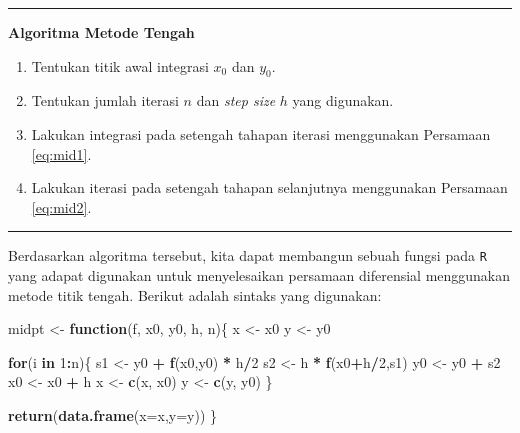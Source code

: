 \documentclass[]{book}
\newenvironment{Shaded}{\begin{snugshade}}{\end{snugshade}}
\newcommand{\ControlFlowTok}[1]{\textcolor[rgb]{0.13,0.29,0.53}{\textbf{#1}}}
\newcommand{\DataTypeTok}[1]{\textcolor[rgb]{0.13,0.29,0.53}{#1}}
\newcommand{\DecValTok}[1]{\textcolor[rgb]{0.00,0.00,0.81}{#1}}
\newcommand{\KeywordTok}[1]{\textcolor[rgb]{0.13,0.29,0.53}{\textbf{#1}}}
\newcommand{\NormalTok}[1]{#1}
\newcommand{\OperatorTok}[1]{\textcolor[rgb]{0.81,0.36,0.00}{\textbf{#1}}}
\newcommand{\StringTok}[1]{\textcolor[rgb]{0.31,0.60,0.02}{#1}}
\providecommand{\tightlist}{%
  \setlength{\itemsep}{0pt}\setlength{\parskip}{0pt}}
\theoremstyle{definition}
\theoremstyle{definition}
\theoremstyle{definition}
\theoremstyle{remark}
\begin{document}
\begin{center}\rule{0.5\linewidth}{\linethickness}\end{center}

\textbf{Algoritma Metode Tengah}

\begin{enumerate}
\def\labelenumi{\arabic{enumi}.}
\tightlist
\item
  Tentukan titik awal integrasi \(x_0\) dan \(y_0\).
\item
  Tentukan jumlah iterasi \(n\) dan \emph{step size} \(h\) yang digunakan.
\item
  Lakukan integrasi pada setengah tahapan iterasi menggunakan Persamaan \eqref{eq:mid1}.
\item
  Lakukan iterasi pada setengah tahapan selanjutnya menggunakan Persamaan \eqref{eq:mid2}.
\end{enumerate}

\begin{center}\rule{0.5\linewidth}{\linethickness}\end{center}

Berdasarkan algoritma tersebut, kita dapat membangun sebuah fungsi pada \texttt{R} yang adapat digunakan untuk menyelesaikan persamaan diferensial menggunakan metode titik tengah. Berikut adalah sintaks yang digunakan:

\begin{Shaded}
\begin{Highlighting}[]
\NormalTok{midpt <-}\StringTok{ }\ControlFlowTok{function}\NormalTok{(f, x0, y0, h, n)\{}
\NormalTok{  x <-}\StringTok{ }\NormalTok{x0}
\NormalTok{  y <-}\StringTok{ }\NormalTok{y0}
  
  \ControlFlowTok{for}\NormalTok{(i }\ControlFlowTok{in} \DecValTok{1}\OperatorTok{:}\NormalTok{n)\{}
\NormalTok{    s1 <-}\StringTok{ }\NormalTok{y0 }\OperatorTok{+}\StringTok{ }\KeywordTok{f}\NormalTok{(x0,y0) }\OperatorTok{*}\StringTok{ }\NormalTok{h}\OperatorTok{/}\DecValTok{2}
\NormalTok{    s2 <-}\StringTok{ }\NormalTok{h }\OperatorTok{*}\StringTok{ }\KeywordTok{f}\NormalTok{(x0}\OperatorTok{+}\NormalTok{h}\OperatorTok{/}\DecValTok{2}\NormalTok{,s1)}
\NormalTok{    y0 <-}\StringTok{ }\NormalTok{y0 }\OperatorTok{+}\StringTok{ }\NormalTok{s2}
\NormalTok{    x0 <-}\StringTok{ }\NormalTok{x0 }\OperatorTok{+}\StringTok{ }\NormalTok{h}
\NormalTok{    x <-}\StringTok{ }\KeywordTok{c}\NormalTok{(x, x0)}
\NormalTok{    y <-}\StringTok{ }\KeywordTok{c}\NormalTok{(y, y0)}
\NormalTok{  \}}
  
  \KeywordTok{return}\NormalTok{(}\KeywordTok{data.frame}\NormalTok{(}\DataTypeTok{x=}\NormalTok{x,}\DataTypeTok{y=}\NormalTok{y))}
\NormalTok{\}}
\end{Highlighting}
\end{Shaded}
\end{document}
